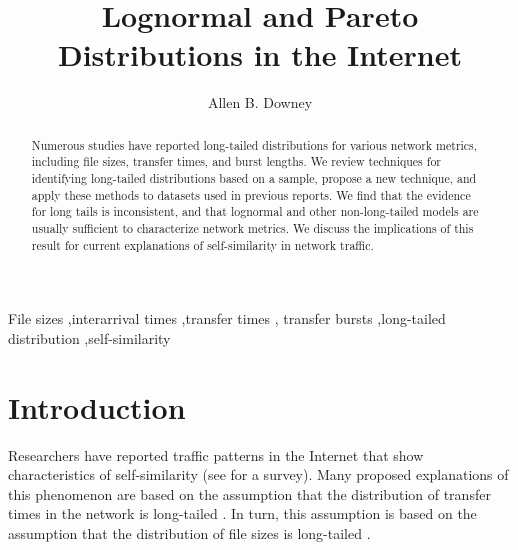 \documentclass{elsart}
\begin{document}
\begin{frontmatter}

\title{Lognormal and Pareto Distributions in the Internet}

\author{Allen B. Downey}
\corauth[cor1]{}
\address{Olin College of Engineering\\
Olin Way\\ 
Needham, MA 02492}


\begin{abstract}

Numerous studies have reported long-tailed distributions for various
network metrics, including file sizes, transfer times, and burst
lengths.  We review techniques for identifying long-tailed
distributions based on a sample, propose a new technique, and apply
these methods to datasets used in previous reports.  We find that the
evidence for long tails is inconsistent, and that lognormal and other
non-long-tailed models are usually sufficient to characterize network
metrics.  We discuss the implications of this result for current
explanations of self-similarity in network traffic.

\end{abstract}

\begin{keyword}
File sizes \sep interarrival times \sep transfer times \sep
transfer bursts \sep long-tailed distribution \sep self-similarity
\end{keyword}

\end{frontmatter}

\section{Introduction}
\label {intro}

Researchers have reported traffic patterns in the Internet that
show characteristics of self-similarity (see \cite{ParkWillinger00}
for a survey).  Many proposed explanations of this phenomenon are
based on the assumption that the distribution of transfer times in the
network is long-tailed \cite{PaxsonFloyd95} \cite{ParulekarMakowski96}
\cite{WillingerTaqquShermanWilson95}
\cite{FeldmannGilbertHuangWillinger99}.  In turn, this assumption is
based on the assumption that the distribution of file sizes is
long-tailed \cite{ParkKimCrovella96} \cite{CrovellaTaqquBestavros99}.
\end{document}

